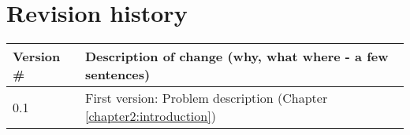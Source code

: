 \chapter*{Revision history}

\begin{center}
\begin{tabular}[H]{|l|p{35em}|}
\hline
Version \#  & Description of change (why, what where - a few sentences)\\
\hline
      0.1   & First version: Problem description (Chapter \ref{chapter2:introduction})\\
\hline
\end{tabular}
\end{center}
